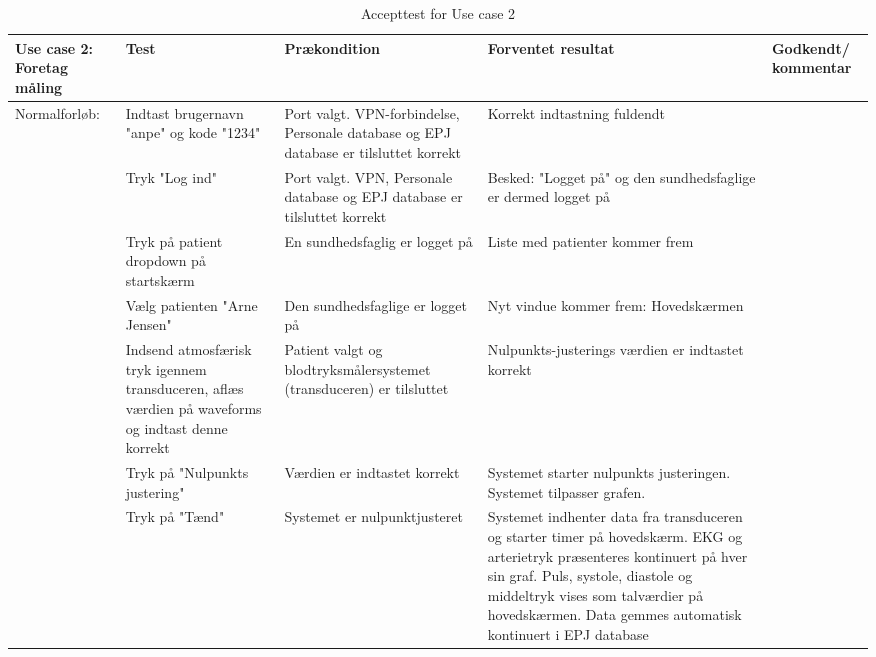\begin{table}[H]
\caption{Accepttest for Use case 2}\label{tab:tabel9}
\begin{tabular}{|>{\raggedright\arraybackslash}p{2.5cm}| >{\raggedright\arraybackslash}p{2.9cm} | >{\raggedright\arraybackslash}p{2.9cm} | >{\raggedright\arraybackslash}p{2.9cm} | >{\raggedright\arraybackslash}p{2.8cm} |}
   \hline
   \textbf{Use case 2: Foretag måling} &\textbf{Test}& \textbf{Prækondition} & \textbf{Forventet resultat} & \textbf{Godkendt/ kommentar}\\ \hline
   Normalforløb:& Indtast brugernavn "anpe" og kode "1234" & Port valgt. VPN-forbindelse, Personale database og EPJ database er tilsluttet korrekt & Korrekt indtastning fuldendt & \\\hline
   &Tryk "Log ind" & Port valgt. VPN, Personale database og EPJ database er tilsluttet korrekt & Besked: "Logget på" og den sundhedsfaglige er dermed logget på &\\\hline
   &Tryk på patient dropdown på startskærm & En sundhedsfaglig er logget på & Liste med patienter kommer frem  & \\\hline
   & Vælg patienten "Arne Jensen" & Den sundhedsfaglige er logget på & Nyt vindue kommer frem: Hovedskærmen &\\\hline
   & Indsend atmosfærisk tryk igennem transduceren, aflæs værdien på waveforms og indtast denne korrekt & Patient valgt og blodtryksmålersystemet (transduceren) er tilsluttet & Nulpunkts-justerings værdien er indtastet korrekt &\\\hline
   & Tryk på "Nulpunkts justering" & Værdien er indtastet korrekt & Systemet starter nulpunkts justeringen. Systemet tilpasser grafen. &\\\hline
   & Tryk på "Tænd"& Systemet er nulpunktjusteret & Systemet indhenter data fra transduceren og starter timer på hovedskærm. EKG og arterietryk præsenteres kontinuert på hver sin graf. Puls, systole, diastole og middeltryk vises som talværdier på hovedskærmen. Data gemmes automatisk kontinuert i EPJ database & \\\hline
\end{tabular}
\end{table}



